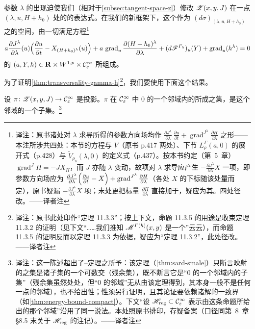 参数 $\lambda$ 的出现迫使我们（相对于\cref{subsec:tangent-space-z}）修改 $\mathscr{Z}(x,y,J)$ 在一点 $(\lambda,u,H+h_{0})$ 处的\trTangentSpace{}的表达式。在我们的新框架下，这个作为 $(d\sigma)_{(\lambda,u,H+h_{0})}$ 之\trKernel{}的空间，由一切满足方程\footnote{译注：原书诸处对 $\lambda$ 求导所得的参数方向场均作 $\frac{\partial J^{\lambda}}{\partial\lambda}\,\frac{\partial u}{\partial t}+\operatorname{grad}^{J^{\lambda}}\frac{\partial H}{\partial\lambda}$ 之形——本注所涉共四处：本节的\trTangentSpace{}方程与\trVectorField{} $V$（原书 p.417 两处）、下节 $L_{\rho}^{\varGamma}(a,0)$ 的展开式（p.428）与 $\widetilde{V}_{\rho_{n}}(\lambda,0)$ 的定义式（p.437）。按本书约定（第~5~章）$\operatorname{grad}^{J}H=-JX_{H}$，而 $J$ 亦随 $\lambda$ 变动，故\trGradient{}项对 $\lambda$ 求导应产生 $-\frac{\partial J^{\lambda}}{\partial\lambda}X$ 一项，即参数方向场应为 $\frac{\partial J^{\lambda}}{\partial\lambda}\Bigl(\frac{\partial u}{\partial t}-X\Bigr)+\operatorname{grad}^{J^{\lambda}}\frac{\partial H}{\partial\lambda}$（各处 $X$ 的下标随该处\trHamiltonian{}量而定），原书疑漏 $-\frac{\partial J^{\lambda}}{\partial\lambda}X$ 项；末处更把标量 $\frac{\partial H}{\partial\lambda}$ 直接加于\trVectorField，疑应为其\trGradient。四处径改。——译者注}
\[
a\frac{\partial J^{\lambda}}{\partial\lambda}(u)\Bigl(\frac{\partial u}{\partial t}-X_{(H+h_{0})^{\lambda}}(u)\Bigr)
+a\,\operatorname{grad}_{u}\frac{\partial(H+h_{0})^{\lambda}}{\partial\lambda}
+(d\mathscr{F}^{\varGamma_{\lambda}})_{u}(Y)+\operatorname{grad}_{u}(h^{\lambda})=0
\]
的 $(a,Y,h)\in\mathbf{R}\times W^{1,p}\times\mathcal{C}^{\infty}_{\varepsilon}$ 所组成。

为了证明\cref{thm:transversality-gamma-h}\footnote{译注：原书此处印作“定理 11.3.3”；按上下文，命题 11.3.5 的用途是收束定理 11.3.2 的证明（见下文“……我们推知 $\mathscr{M}^{\varGamma(h)}(x,y)$ 是一个\trManifoldWithBoundary”云云），而命题 11.3.5 的证明反而以定理 11.3.3 为依据，疑应为“定理 11.3.2”，此处径改。——译者注}，我们要使用下面这个结果。

\begin{proposition}\label{thm:pi-regular-values}
设 $\pi\colon\mathscr{Z}(x,y,J)\to\mathcal{C}^{\infty}_{\varepsilon}$ 是投影。$\pi$ 在 $\mathcal{C}^{\infty}_{\varepsilon}$ 中 $0$ 的一个邻域内的\trRegularValue{}所成之集，是这个邻域的一个\trDense\trOpen{}子集。\footnote{译注：这一陈述超出了\trSard--\trSmale{}定理之所予：该定理（\cref{thm:sard-smale}）只断言\trFredholm{}映射的\trRegularValue{}之集是诸\trDense\trOpen{}子集的一个可数交（残余集），既不断言它是“$0$ 的一个邻域内的\trDense\trOpen{}子集”（残余集虽然处处\trDense，但“$0$ 的邻域”无从由该定理得到，其本身一般不是任何一点的邻域），也不给出\trOpen{}性；\trOpen{}性须另行证明，且其论证要依赖诸解的\trEnergy{}一致界（如\cref{thm:energy-bound-compact}）。下文“设 $\mathscr{H}_{\mathrm{reg}}\subset\mathcal{C}^{\infty}_{\varepsilon}$ 表示由这条命题所给出的那个邻域”沿用了同一说法。本处照原书排印，存疑备案（口径同第~8~章 §8.5 末关于 $\mathscr{H}_{\mathrm{reg}}$ 的注记）。——译者注}
\end{proposition}

